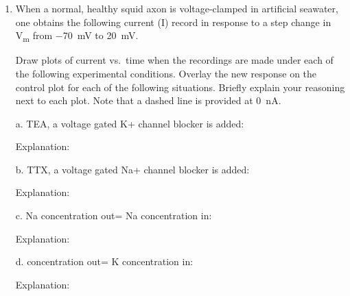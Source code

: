 \documentclass[plain,worksheet,]{inVerba-notes}
\begin{document}
\begin{enumerate}[resume]
    \item When a normal, healthy squid axon is voltage-clamped in artificial seawater, one obtains the following current (I) record in response to a step change in \si{V_m} from \SI{-70}{mV} to \SI{+20}{mV}.
    
    \bigskip
    \bigskip
    \begin{center}
        
    \end{center}

    Draw plots of current vs.\ time when the recordings are made under each of the following experimental conditions. Overlay the new response on the control plot for each of the following situations. Briefly explain your reasoning next to each plot. Note that a dashed line is provided at \SI{0}{nA}. 
    
    \item[a.] TEA, a voltage gated K+ channel blocker is added:
    
    \bigskip
    \bigskip
    \begin{center}
        
    \end{center}

    Explanation:
    \vspace{80pt}

    \item[b.] TTX, a voltage gated Na+ channel blocker is added:
    
    \bigskip
    \bigskip
    \begin{center}
        
    \end{center}
    
    Explanation:
    \vspace{80pt}

    \newpage
    \item[c.] Na concentration out= Na concentration in:
    
    \bigskip
    \bigskip
    \begin{center}
        
    \end{center}
    
    Explanation:
    \vspace{80pt}

    \item[d.]  concentration out= K concentration in:

    \bigskip
    \bigskip
    \begin{center}
        
    \end{center}
    
    Explanation:
    \vspace{80pt}
\end{enumerate}
\end{document}
